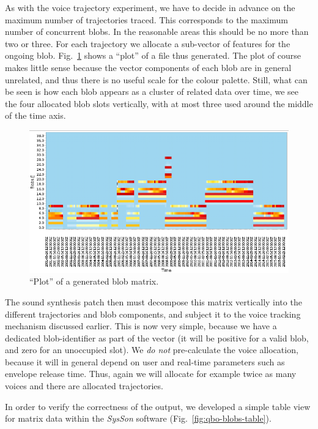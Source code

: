 \documentclass[11pt,a4paper]{article}
\newcommand{\figref}[1]{Fig.~\ref{#1}}
\newcommand{\software}[1]{\textit{#1}}
\begin{document}
As with the voice trajectory experiment, we have to decide in advance on the maximum number of trajectories traced. This corresponds to the maximum number of concurrent blobs. In the reasonable areas this should be no more than two or three. For each trajectory we allocate a sub-vector of features for the ongoing blob. \figref{fig:qbo-blobs-matrix-out} shows a ``plot'' of a file thus generated. The plot of course makes little sense because the vector components of each blob are in general unrelated, and thus there is no useful scale for the colour palette. Still, what can be seen is how each blob appears as a cluster of related data over time, we see the four allocated blob slots vertically, with at most three used around the middle of the time axis.

\begin{figure}
\includegraphics[width=\textwidth]{figures/qbo-blobs-matrix-out.png}
\caption{``Plot'' of a generated blob matrix.}
\label{fig:qbo-blobs-matrix-out}
\end{figure}

The sound synthesis patch then must decompose this matrix vertically into the different trajectories and blob components, and subject it to the voice tracking mechanism discussed earlier. This is now very simple, because we have a dedicated blob-identifier as part of the vector (it will be positive for a valid blob, and zero for an unoccupied slot). We \emph{do not} pre-calculate the voice allocation, because it will in general depend on user and real-time parameters such as envelope release time. Thus, again we will allocate for example twice as many voices and there are allocated trajectories.

In order to verify the correctness of the output, we developed a simple table view for matrix data within the \software{SysSon} software (\figref{fig:qbo-blobs-table}).
\end{document}
